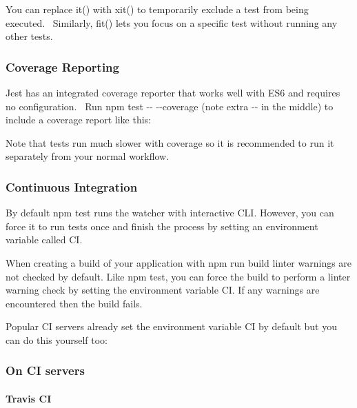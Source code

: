 You can replace {\ttfamily it()} with {\ttfamily xit()} to temporarily exclude a test from being executed.~\newline
 Similarly, {\ttfamily fit()} lets you focus on a specific test without running any other tests.

\subsubsection*{Coverage Reporting}

Jest has an integrated coverage reporter that works well with E\+S6 and requires no configuration.~\newline
 Run {\ttfamily npm test -\/-\/ -\/-\/coverage} (note extra {\ttfamily -\/-\/} in the middle) to include a coverage report like this\+:



Note that tests run much slower with coverage so it is recommended to run it separately from your normal workflow.

\subsubsection*{Continuous Integration}

By default {\ttfamily npm test} runs the watcher with interactive C\+LI. However, you can force it to run tests once and finish the process by setting an environment variable called {\ttfamily CI}.

When creating a build of your application with {\ttfamily npm run build} linter warnings are not checked by default. Like {\ttfamily npm test}, you can force the build to perform a linter warning check by setting the environment variable {\ttfamily CI}. If any warnings are encountered then the build fails.

Popular CI servers already set the environment variable {\ttfamily CI} by default but you can do this yourself too\+:

\subsubsection*{On CI servers}

\paragraph*{Travis CI}


